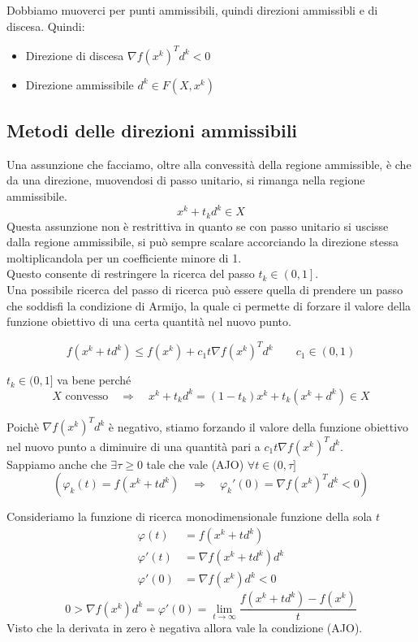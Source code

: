 Dobbiamo muoverci per punti ammissibili, quindi direzioni ammissibli e
di discesa.
Quindi:
\begin{itemize}
\item Direzione di discesa \quad $\nabla f(x^k)^Td^k < 0$
\item Direzione ammissibile \quad $d^k \in F(X,x^k)$
\end{itemize}

\subsection{Metodi delle direzioni ammissibili}
Una assunzione che facciamo, oltre alla convessit\`a della regione
ammissible, \`e che da una direzione, muovendosi di passo unitario, si
rimanga nella regione ammissibile.
$$ x^k + t_k d^k \in X $$
Questa assunzione non \`e restrittiva in quanto se con passo unitario
si uscisse dalla regione ammissibile, si pu\`o sempre scalare
accorciando la direzione stessa moltiplicandola per un coefficiente
minore di 1.\\
Questo consente di restringere la ricerca del passo $t_k \in \left (
0,1\right ]$.\\
Una possibile ricerca del passo di ricerca pu\`o essere quella di
prendere un passo che soddisfi la condizione di Armijo, la quale ci
permette di forzare il valore della funzione obiettivo di una certa
quantit\`a nel nuovo punto.

\begin{defn}
  $$ f(x^k +td^k) \leq f(x^k) + c_1 t \nabla f(x^k)^Td^k \qquad
  c_1 \in (0,1) $$
\end{defn}
\begin{observation}
  $t_k \in (0,1]$ va bene perch\'e
  $$ X \text{ convesso}  \quad \Rightarrow \quad x^{k} + t_kd^{k} = 
  (1-t_k)x^{k} + t_k(x^{k} + d^{k}) \in X$$
\end{observation}
Poich\`e $\nabla f(x^k)^Td^k$ \`e negativo, stiamo forzando il valore
della funzione obiettivo nel nuovo punto a diminuire di una quantit\`a
pari a $c_1 t \nabla f(x^k)^Td^k$.\\

Sappiamo anche che $\exists \tau \ge 0$ tale che vale (AJO)
$\forall t \in (0,\tau]$
$$( \varphi_k(t) = f(x^{k} + td^{k}) \quad \Rightarrow \quad
\varphi_k'(0)  = \nabla f(x^{k})^{T} d^{k}<0 )  $$

\begin{thproof}
  Consideriamo la funzione di ricerca monodimensionale funzione della sola $t$
  \[\begin{array}{ll}
    \varphi (t) &= f(x^k + td^k) \\
    \varphi'(t) &= \nabla f(x^k+td^k)d^k \\
    \varphi'(0) &= \nabla f(x^k)d^k < 0
  \end{array}\]
  $$ 0 > \nabla f(x^k)d^k = \varphi '(0) = 
  \lim_{t \to \infty}\frac{f(x^k + td^k) - f(x^k)}{t} $$
  Visto che la derivata in zero è negativa allora vale la condizione (AJO).
\end{thproof}


